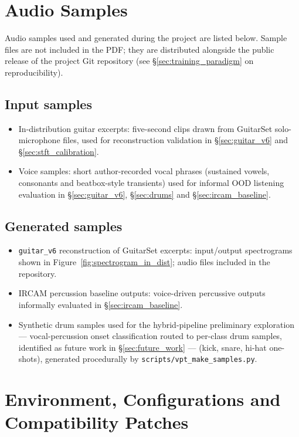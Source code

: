 \documentclass[a4paper,11pt,oneside,openany]{book}
\begin{document}
\begin{appendices}
\chapter{Audio Samples}\label{app:audio_samples}

Audio samples used and generated during the project are listed below. Sample files are not included in the PDF; they are distributed alongside the public release of the project Git repository (see \S\ref{sec:training_paradigm} on reproducibility).

\section{Input samples}
\begin{itemize}
\item In-distribution guitar excerpts: five-second clips drawn from GuitarSet \parencite{xi2018guitarset} solo-microphone files, used for reconstruction validation in \S\ref{sec:guitar_v6} and \S\ref{sec:stft_calibration}.
\item Voice samples: short author-recorded vocal phrases (sustained vowels, consonants and beatbox-style transients) used for informal OOD listening evaluation in \S\ref{sec:guitar_v6}, \S\ref{sec:drums} and \S\ref{sec:ircam_baseline}.
\end{itemize}

\section{Generated samples}
\begin{itemize}
\item \texttt{guitar\_v6} reconstruction of GuitarSet excerpts: input/output spectrograms shown in Figure~\ref{fig:spectrogram_in_dist}; audio files included in the repository.
\item IRCAM percussion baseline outputs: voice-driven percussive outputs informally evaluated in \S\ref{sec:ircam_baseline}.
\item Synthetic drum samples used for the hybrid-pipeline preliminary exploration --- vocal-percussion onset classification routed to per-class drum samples, identified as future work in \S\ref{sec:future_work} --- (kick, snare, hi-hat one-shots), generated procedurally by \texttt{scripts/vpt\_make\_samples.py}.
\end{itemize}

\chapter{Environment, Configurations and Compatibility Patches}\label{app:configs}


\end{appendices}
\end{document}
